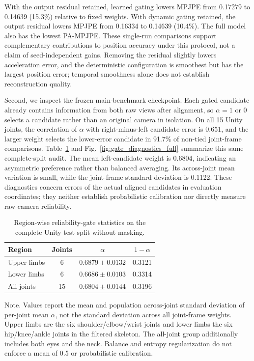 \documentclass[preprint,12pt]{elsarticle}
\renewcommand{\textit}[1]{\textup{#1}}
\begin{document}


With the output residual retained, learned gating lowers MPJPE from 0.17279 to 0.14639 (15.3\%) relative to fixed weights. With dynamic gating retained, the output residual lowers MPJPE from 0.16334 to 0.14639 (10.4\%). The full model also has the lowest PA-MPJPE. These single-run comparisons support complementary contributions to position accuracy under this protocol, not a claim of seed-independent gains. Removing the residual slightly lowers acceleration error, and the deterministic configuration is smoothest but has the largest position error; temporal smoothness alone does not establish reconstruction quality.

Second, we inspect the frozen main-benchmark checkpoint. Each gated candidate already contains information from both raw views after alignment, so \(\alpha=1\) or 0 selects a candidate rather than an original camera in isolation. On all 15 Unity joints, the correlation of \(\alpha\) with right-minus-left candidate error is 0.651, and the larger weight selects the lower-error candidate in 91.7\% of non-tied joint-frame comparisons. Table~\ref{tab:gate_region_summary} and Fig.~\ref{fig:gate_diagnostics_full} summarize this same complete-split audit. The mean left-candidate weight is 0.6804, indicating an asymmetric preference rather than balanced averaging. Its across-joint mean variation is small, while the joint-frame standard deviation is 0.1122. These diagnostics concern errors of the actual aligned candidates in evaluation coordinates; they neither establish probabilistic calibration nor directly measure raw-camera reliability.

\begin{table}[t]
\centering
\caption{Region-wise reliability-gate statistics on the complete Unity test split without masking.}
\label{tab:gate_region_summary}
\footnotesize
\setlength{\tabcolsep}{6pt}
\renewcommand{\arraystretch}{1.08}
\begin{tabular}{lccc}
\toprule
Region & Joints & \(\alpha\) & \(1-\alpha\) \\
\midrule
Upper limbs & 6 & \(0.6879 \pm 0.0132\) & 0.3121 \\
Lower limbs & 6 & \(0.6686 \pm 0.0103\) & 0.3314 \\
All joints & 15 & \(0.6804 \pm 0.0144\) & 0.3196 \\
\bottomrule
\end{tabular}
\vspace{0.4em}
\begin{minipage}{0.94\linewidth}
\footnotesize
\textit{Note.} Values report the mean and population across-joint standard deviation of per-joint mean \(\alpha\), not the standard deviation across all joint-frame weights. Upper limbs are the six shoulder/elbow/wrist joints and lower limbs the six hip/knee/ankle joints in the filtered skeleton. The all-joint group additionally includes both eyes and the neck. Balance and entropy regularization do not enforce a mean of 0.5 or probabilistic calibration.
\end{minipage}
\end{table}
\end{document}
